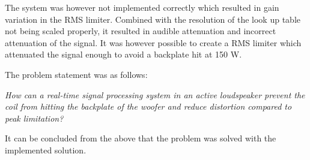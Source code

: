 The system was however not implemented correctly which resulted in gain variation in the RMS limiter. Combined with the resolution of the look up table not being scaled properly, it resulted in audible attenuation and incorrect attenuation of the signal. It was however possible to create a RMS limiter which attenuated the signal enough to avoid a backplate hit at 150 W.

The problem statement was as follows:
\begin{center}
\textit{How can a real-time signal processing system in an active loudspeaker prevent the coil from hitting the backplate of the woofer and reduce distortion compared to peak limitation?}
\end{center}
It can be concluded from the above that the problem was solved with the implemented solution. 